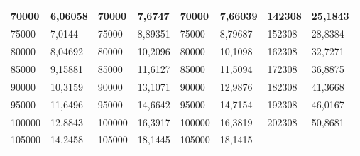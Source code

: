 \documentclass[11pt,openany]{book}
\begin{document}
\begin{table}[!ht]
\begin{tabular}{|l|l|l|l|l|l|l|l|}
        70000                                             & 6,06058                                            & 70000                                               & 7,6747                                              & 70000           & 7,66039         & 142308          & 25,1843         \\ \hline
        75000                                             & 7,0144                                             & 75000                                               & 8,89351                                             & 75000           & 8,79687         & 152308          & 28,8384         \\ \hline
        80000                                             & 8,04692                                            & 80000                                               & 10,2096                                             & 80000           & 10,1098         & 162308          & 32,7271         \\ \hline
        85000                                             & 9,15881                                            & 85000                                               & 11,6127                                             & 85000           & 11,5094         & 172308          & 36,8875         \\ \hline
        90000                                             & 10,3159                                            & 90000                                               & 13,1071                                             & 90000           & 12,9876         & 182308          & 41,3668         \\ \hline
        95000                                             & 11,6496                                            & 95000                                               & 14,6642                                             & 95000           & 14,7154         & 192308          & 46,0167         \\ \hline
        100000                                            & 12,8843                                            & 100000                                              & 16,3917                                             & 100000          & 16,3819         & 202308          & 50,8681         \\ \hline
        105000                                            & 14,2458                                            & 105000                                              & 18,1445                                             & 105000          & 18,1415         & ~               & ~               \\ \hline

\end{tabular}
\end{table}
\end{document}
